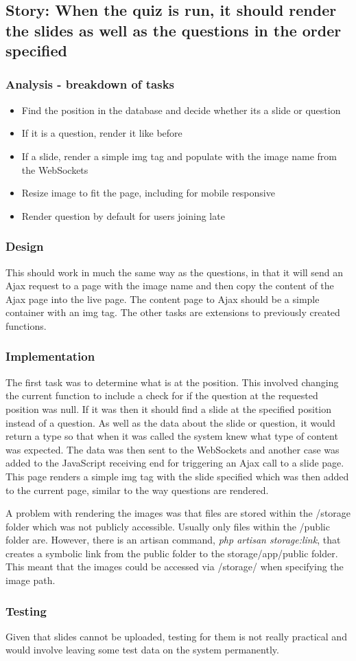 \subsection{Story: When the quiz is run, it should render the slides as well as the questions in the order specified}
\subsubsection{Analysis - breakdown of tasks}
\begin{itemize}
	\item Find the position in the database and decide whether its a slide or question
	\item If it is a question, render it like before
	\item If a slide, render a simple img tag and populate with the image name from the WebSockets
	\item Resize image to fit the page, including for mobile responsive
	\item Render question by default for users joining late
\end{itemize}
\subsubsection{Design}
This should work in much the same way as the questions, in that it will send an Ajax request to a page with the image name and then copy the content of the Ajax page into the live page. The content page to Ajax should be a simple container with an img tag. The other tasks are extensions to previously created functions.
\subsubsection{Implementation}
The first task was to determine what is at the position. This involved changing the current function to include a check for if the question at the requested position was null. If it was then it should find a slide at the specified position instead of a question. As well as the data about the slide or question, it would return a type so that when it was called the system knew what type of content was expected. The data was then sent to the WebSockets and another case was added to the JavaScript receiving end for triggering an Ajax call to a slide page. This page renders a simple img tag with the slide specified which was then added to the current page, similar to the way questions are rendered.

A problem with rendering the images was that files are stored within the /storage folder which was not publicly accessible. Usually only files within the /public folder are. However, there is an artisan command, \textit{php artisan storage:link}, that creates a symbolic link from the public folder to the storage/app/public folder. This meant that the images could be accessed via /storage/ when specifying the image path.
\subsubsection{Testing}
Given that slides cannot be uploaded, testing for them is not really practical and would involve leaving some test data on the system permanently.
\newpage